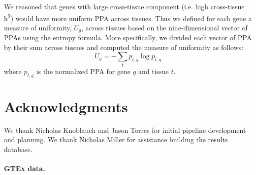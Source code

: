 \documentclass[10pt,letterpaper]{article}
\begin{document}
We reasoned that genes with large cross-tissue component (i.e. high cross-tissue h\textsuperscript{2}) would have more uniform PPA across tissues. Thus we defined for each gene a measure of uniformity, $U_g$, across tissues based on the nine-dimensional vector of PPAs using the entropy formula. More specifically, we divided each vector of PPA by their sum across tissues and computed the measure of uniformity as follows:
%
\[ U_g = -\sum_{t}p_{t,g} \log p_{t,g} \]
%
where \(p_{t,g}\) is the normalized PPA for gene $g$ and tissue $t$.



\section*{Acknowledgments}
We thank Nicholas Knoblauch and Jason Torres for initial pipeline
development and planning. We thank Nicholas Miller for assistance building
the results database.

%


\paragraph{GTEx data.}\label{gtex-data}
\end{document}
